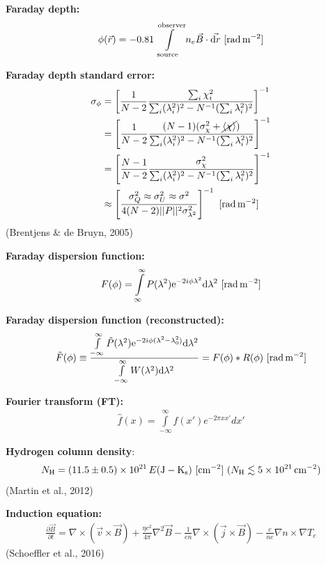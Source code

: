 \documentclass[a4paper,10pt]{article}
\begin{document}
{\noindent}\textbf{Faraday depth:} 
\begin{align*}
    \phi(\vec{r}) = -0.81 \int\limits_\mathrm{source}^\mathrm{observer}n_e\vec{B}\cdot\vec{{\rm d}r} ~ [{\rm rad\,m^{-2}}]
\end{align*}

{\noindent}\textbf{Faraday depth standard error:}
\begin{align*}
\sigma_\phi &= \left[ \dfrac{1}{N-2} \dfrac{\sum_i\chi_i^2}{\sum_i(\lambda_i^2)^2 - N^{-1}(\sum_i\lambda_i^2)^2} \right]^{-1} \\
&= \left[ \dfrac{1}{N-2} \dfrac{(N-1)(\sigma_\chi^2 + \cancel{\langle\chi\rangle})}{\sum_i(\lambda_i^2)^2 - N^{-1}(\sum_i\lambda_i^2)^2} \right]^{-1} \\
&= \left[ \dfrac{N-1}{N-2} \dfrac{\sigma_\chi^2}{\sum_i(\lambda_i^2)^2 - N^{-1}(\sum_i\lambda_i^2)^2} \right]^{-1} \\
&\approx \left[ \dfrac{\sigma_Q^2\approx\sigma_U^2\approx\sigma^2}{4(N-2)\lvert\lvert P \rvert\rvert^2\sigma_{\lambda^2}^2} \right]^{-1} ~ [{\rm rad\,m^{-2}}]
\end{align*}
(Brentjens \& de Bruyn, 2005)

{\noindent}\textbf{Faraday dispersion function:}
\begin{align*}
F(\phi) = \int\limits_{\infty}^\infty P(\lambda^2)\mathrm{e}^{-2i\phi\lambda^2}\mathrm{d}\lambda^2 ~ [{\rm rad\,m^{-2}}]
\end{align*}

{\noindent}\textbf{Faraday dispersion function (reconstructed):}
\begin{align*}
\tilde{F}(\phi) \equiv \dfrac{\int\limits_{-\infty}^\infty \tilde{P}(\lambda^2)\mathrm{e}^{-2i\phi(\lambda^2-\lambda_0^2)}\mathrm{d}\lambda^2}{\int\limits_{-\infty}^\infty W(\lambda^2)\mathrm{d}\lambda^2} = F(\phi) * R(\phi) ~ [{\rm rad\,m^{-2}}]
\end{align*}

{\noindent}\textbf{Fourier transform (FT):}
\begin{align*}
    \hat{f}(x) = \int\limits_{-\infty}^\infty f(x')e^{-2\pi xx'}dx'
\end{align*}

{\noindent}\textbf{Hydrogen column density}:
\begin{align*}
    N_{\rm H} = (11.5\pm0.5)\times10^{21}\,E({\rm J-K_s}) ~ [{\rm cm^{-2}}]~(N_{\rm H}\lesssim5\times10^{21}\,{\rm cm^{-2}})
\end{align*}
(Martin et al., 2012)

{\noindent}\textbf{Induction equation:}
\begin{align*}
    \frac{\partial\vec{B}}{\partial t} = \nabla\times(\vec{v}\times\vec{B}) + \frac{\eta c^2}{4\pi}\nabla^2\vec{B} - \frac{1}{en}\nabla\times(\vec{j}\times\vec{B}) - \frac{c}{ne}\nabla n\times\nabla T_e
\end{align*}
(Schoeffler et al., 2016)
\end{document}
